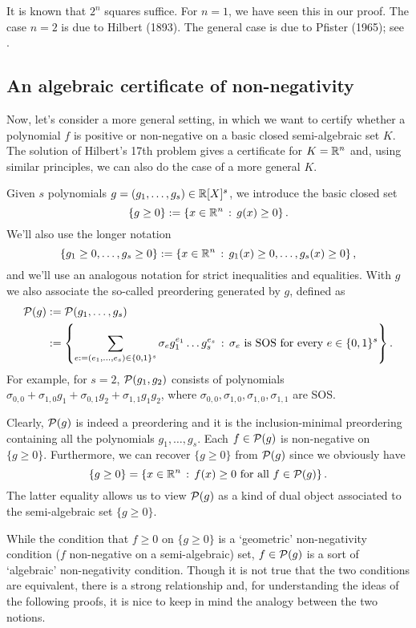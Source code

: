\begin{remark}
	It is known that $2^n$ squares suffice. For $n=1$, we have seen this in our proof. The case $n=2$ is due to Hilbert (1893). The general case is due to Pfister (1965); see \cite{Bochnak:Coste:Roy:1998}. 
\end{remark}

\subsection{An algebraic certificate of non-negativity}

Now, let's consider a more general setting, in which we want to certify whether a polynomial $f$ is positive or non-negative on a basic closed semi-algebraic set $K$. The solution of Hilbert's 17th problem gives a certificate for $K=\mathbb{R}^n$ and, using similar principles, we can also do the case of a more general $K$. 

Given $s$ polynomials $g=(g_1,\ldots,g_s) \in \mathbb{R}[X]^s$, we introduce the basic closed set 
\[
	\{g \ge 0\} := \left\{ x \in \mathbb{R}^n \,:\, g(x) \ge 0 \right\}.
\]
We'll also use the longer notation
\[
	\{g_1 \ge 0,\ldots, g_s \ge 0\} := \left\{  x \in\mathbb{R}^n \,:\, g_1(x) \ge 0,\ldots,g_s(x) \ge 0 \right\},
\]
and we'll use an analogous notation for strict inequalities and equalities. With $g$ we also associate
the so-called preordering generated by $g$, defined as
\begin{align*}
	\cP(g) & := \cP(g_1,\ldots,g_s) 
	\\ & := \setcond{\sum_{e:=(e_1,\ldots,e_s) \in \{0,1\}^s} \sigma_e g_1^{e_1} \ldots g_s^{e_s} }{ \sigma_e \ \text{is SOS} \ \text{for every} \ e \in \{0,1\}^s}.
\end{align*}
For example, for $s=2$, $\mathcal{P}(g_1,g_2)$ consists of polynomials $\sigma_{0,0} + \sigma_{1,0} g_1 + \sigma_{0,1} g_2 + \sigma_{1,1} g_1 g_2$, where $\sigma_{0,0}, \sigma_{1,0}, \sigma_{1,0}, \sigma_{1,1}$ are SOS. 

Clearly, $\mathcal{P}(g)$ is indeed a preordering and it is the inclusion-minimal preordering containing all the polynomials $g_1,\ldots,g_s$. Each $f \in \mathcal{P}(g)$ is non-negative on $\{g \ge 0\}$. Furthermore, we can recover $\{g \ge 0\}$ from $\mathcal{P}(g)$ since we obviously have 
\[
	\{g \ge 0\} = \left\{ x \in \mathbb{R}^n \,:\, f(x) \ge 0 \ \text{for all} \ f \in \mathcal{P}(g) \right\}.
\]
The latter equality allows us to view $\mathcal{P}(g)$ as a kind of dual object associated to the semi-algebraic set $\{g \ge 0\}$. 

While the condition that $f \ge 0$ on $\{g \ge 0\}$ is a `geometric' non-negativity condition ($f$ non-negative on a semi-algebraic) set, $f \in \mathcal{P}(g)$ is a sort of `algebraic' non-negativity condition. Though it is not true that the two conditions are equivalent, there is a strong relationship and, for understanding the ideas of the following proofs, it is nice to keep in mind the analogy between the two notions. 

